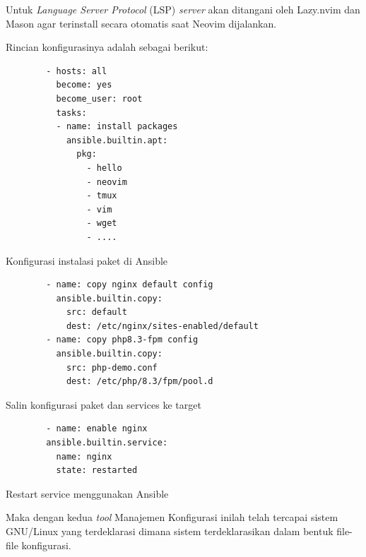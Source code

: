 \documentclass[10pt,]{report}
\newenvironment{code}{\captionsetup{type=listing}}{\vspace{3mm}}
\begin{document}
\begin{adjustwidth}{20pt}{}
\begin{adjustwidth}{20pt}{}
		Untuk \textit{Language Server Protocol} (LSP) \textit{server} akan
		ditangani oleh Lazy.nvim dan Mason agar terinstall secara otomatis
		saat Neovim dijalankan.

		Rincian konfigurasinya adalah sebagai berikut:

		\begin{code}
			\begin{verbatim}
        - hosts: all
          become: yes
          become_user: root
          tasks:
          - name: install packages
            ansible.builtin.apt:
              pkg:
                - hello
                - neovim
                - tmux
                - vim
                - wget
                - ....
      \end{verbatim}
			\caption{Konfigurasi instalasi paket di Ansible}
		\end{code}

		\begin{code}
			\begin{verbatim}
        - name: copy nginx default config
          ansible.builtin.copy:
            src: default
            dest: /etc/nginx/sites-enabled/default
        - name: copy php8.3-fpm config
          ansible.builtin.copy:
            src: php-demo.conf
            dest: /etc/php/8.3/fpm/pool.d
      \end{verbatim}
			\caption{Salin konfigurasi paket dan services ke target}
		\end{code}

		\begin{code}
			\begin{verbatim}
        - name: enable nginx
        ansible.builtin.service:
          name: nginx
          state: restarted
      \end{verbatim}
			\caption{Restart service menggunakan Ansible}
		\end{code}

		Maka dengan kedua \textit{tool} Manajemen Konfigurasi inilah telah tercapai sistem
		GNU/Linux yang terdeklarasi dimana sistem terdeklarasikan dalam bentuk
		file-file konfigurasi.
	\end{adjustwidth}
\end{adjustwidth}
\newpage
\end{document}
